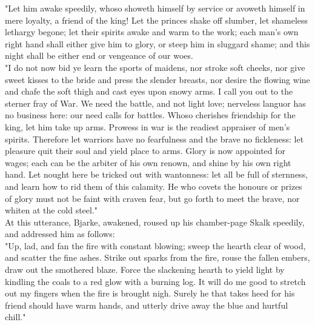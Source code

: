 \documentclass[10pt,a4paper]{report}
\begin{document}
"Let him awake speedily, whoso showeth himself by service or avoweth himself in mere loyalty, a friend of the king! Let the princes shake off slumber, let shameless lethargy begone; let their spirits awake and warm to the work; each man's own right hand shall either give him to glory, or steep him in sluggard shame; and this night shall be either end or vengeance of our woes.\\

"I do not now bid ye learn the sports of maidens, nor stroke soft cheeks, nor give sweet kisses to the bride and press the slender breasts, nor desire the flowing wine and chafe the soft thigh and cast eyes upon snowy arms. I call you out to the sterner fray of War. We need the battle, and not light love; nerveless languor has no business here: our need calls for battles. Whoso cherishes friendship for the king, let him take up arms. Prowess in war is the readiest appraiser of men's spirits. Therefore let warriors have no fearfulness and the brave no fickleness: let pleasure quit their soul and yield place to arms. Glory is now appointed for wages; each can be the arbiter of his own renown, and shine by his own right hand. Let nought here be tricked out with wantonness: let all be full of sternness, and learn how to rid them of this calamity. He who covets the honours or prizes of glory must not be faint with craven fear, but go forth to meet the brave, nor whiten at the cold steel."\\

At this utterance, Bjarke, awakened, roused up his chamber-page Skalk speedily, and addressed him as follows:\\

"Up, lad, and fan the fire with constant blowing; sweep the hearth clear of wood, and scatter the fine ashes. Strike out sparks from the fire, rouse the fallen embers, draw out the smothered blaze. Force the slackening hearth to yield light by kindling the coals to a red glow with a burning log. It will do me good to stretch out my fingers when the fire is brought nigh. Surely he that takes heed for his friend should have warm hands, and utterly drive away the blue and hurtful chill."\\
\end{document}
